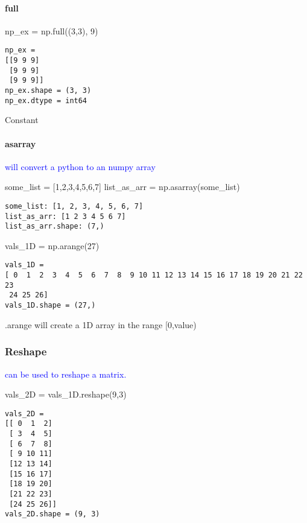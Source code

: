 \paragraph{full}

\begin{python}
np_ex = np.full((3,3), 9)
\end{python}
\begin{lstlisting}[style=pyOutStyle]
np_ex = 
[[9 9 9]
 [9 9 9]
 [9 9 9]]
np_ex.shape = (3, 3)
np_ex.dtype = int64
\end{lstlisting}
\begin{markdown}
Constant
\end{markdown}

\paragraph{asarray}

\textcolor{blue}{ will convert a python  to an numpy array}

\begin{python}
some_list = [1,2,3,4,5,6,7]
list_as_arr = np.asarray(some_list)
\end{python}
\begin{lstlisting}[style=pyOutStyle]
some_list: [1, 2, 3, 4, 5, 6, 7]
list_as_arr: [1 2 3 4 5 6 7]
list_as_arr.shape: (7,)
\end{lstlisting}


\begin{python}
vals_1D = np.arange(27)
\end{python}
\begin{lstlisting}[style=pyOutStyle]
vals_1D = 
[ 0  1  2  3  4  5  6  7  8  9 10 11 12 13 14 15 16 17 18 19 20 21 22 23
 24 25 26]
vals_1D.shape = (27,)
\end{lstlisting}
\begin{markdown}
.arange will create a 1D array in the range [0,value)
\end{markdown}

\subsubsection{Reshape}

\textcolor{blue}{ can be used to reshape a matrix.}

\begin{python}
vals_2D = vals_1D.reshape(9,3)
\end{python}
\begin{lstlisting}[style=pyOutStyle]
vals_2D = 
[[ 0  1  2]
 [ 3  4  5]
 [ 6  7  8]
 [ 9 10 11]
 [12 13 14]
 [15 16 17]
 [18 19 20]
 [21 22 23]
 [24 25 26]]
vals_2D.shape = (9, 3)
\end{lstlisting}



